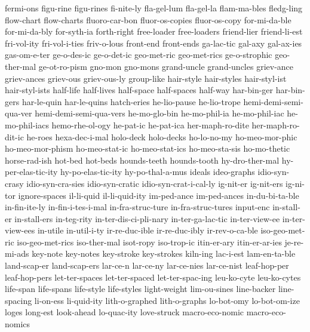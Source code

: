 {{{  fermi-ons
  figu-rine
  figu-rines
  fi-nite-ly
  fla-gel-lum
  fla-gel-la
  flam-ma-bles
  fledg-ling
  flow-chart
  flow-charts
  fluoro-car-bon
  fluor-os-copies
  fluor-os-copy
  for-mi-da-ble
  for-mi-da-bly
  for-syth-ia
  forth-right
  free-loader
  free-loaders
  friend-lier
  friend-li-est
  fri-vol-ity
  fri-vol-i-ties
  friv-o-lous
  front-end
  front-ends
  ga-lac-tic
  gal-axy
  gal-ax-ies
  gas-om-e-ter
  ge-o-des-ic
  ge-o-det-ic
  geo-met-ric
  geo-met-rics
  ge-o-strophic
  geo-ther-mal
  ge-ot-ro-pism
  gno-mon
  gno-mons
  grand-uncle
  grand-uncles
  griev-ance
  griev-ances
  griev-ous
  griev-ous-ly
  group-like
  hair-style
  hair-styles
  hair-styl-ist
  hair-styl-ists
  half-life
  half-lives
  half-space
  half-spaces
  half-way
  har-bin-ger
  har-bin-gers
  har-le-quin
  har-le-quins
  hatch-eries
  he-lio-pause
  he-lio-trope
  hemi-demi-semi-qua-ver
  hemi-demi-semi-qua-vers
  he-mo-glo-bin
  he-mo-phil-ia
  he-mo-phil-iac
  he-mo-phil-iacs
  hemo-rhe-ol-ogy
  he-pat-ic
  he-pat-ica
  her-maph-ro-dite
  her-maph-ro-dit-ic
  he-roes
  hexa-dec-i-mal
  holo-deck
  holo-decks
  ho-lo-no-my
  ho-meo-mor-phic
  ho-meo-mor-phism
  ho-meo-stat-ic
  ho-meo-stat-ics
  ho-meo-sta-sis
  ho-mo-thetic
  horse-rad-ish
  hot-bed
  hot-beds
  hounds-teeth
  hounds-tooth
  hy-dro-ther-mal
  hy-per-elas-tic-ity
  hy-po-elas-tic-ity
  hy-po-thal-a-mus
  ideals
  ideo-graphs
  idio-syn-crasy
  idio-syn-cra-sies
  idio-syn-cratic
  idio-syn-crat-i-cal-ly
  ig-nit-er
  ig-nit-ers
  ig-ni-tor
  ignore-spaces
  il-li-quid
  il-li-quid-ity
  im-ped-ance
  im-ped-ances
  in-du-bi-ta-ble
  in-fin-ite-ly
  in-fin-i-tes-i-mal
  in-fra-struc-ture
  in-fra-struc-tures
  input-enc
  in-stall-er
  in-stall-ers
  in-teg-rity
  in-ter-dis-ci-pli-nary
  in-ter-ga-lac-tic
  in-ter-view-ee
  in-ter-view-ees
  in-utile
  in-util-i-ty
  ir-re-duc-ible
  ir-re-duc-ibly
  ir-rev-o-ca-ble
  iso-geo-met-ric
  iso-geo-met-rics
  iso-ther-mal
  isot-ropy
  iso-trop-ic
  itin-er-ary
  itin-er-ar-ies
  je-re-mi-ads
  key-note
  key-notes
  key-stroke
  key-strokes
  kiln-ing
  lac-i-est
  lam-en-ta-ble
  land-scap-er
  land-scap-ers
  lar-ce-n
  lar-ce-ny
  lar-ce-nies
  lar-ce-nist
  leaf-hop-per
  leaf-hop-pers
  let-ter-spaces
  let-ter-spaced
  let-ter-spac-ing
  leu-ko-cyte
  leu-ko-cytes
  life-span
  life-spans
  life-style
  life-styles
  light-weight
  lim-ou-sines
  line-backer
  line-spacing
  li-on-ess
  li-quid-ity
  lith-o-graphed
  lith-o-graphs
  lo-bot-omy
  lo-bot-om-ize
  loges
  long-est
  look-ahead
  lo-quac-ity
  love-struck
  macro-eco-nomic
  macro-eco-nomics
}}}
